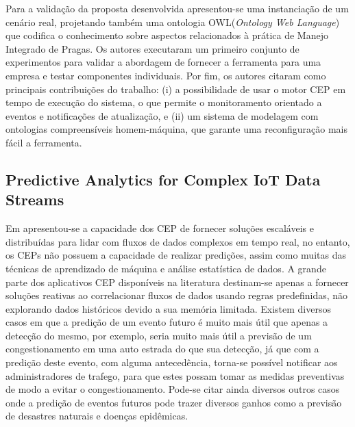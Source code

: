 \documentclass[ti,table]{texufpel} %
\begin{document}
     

    Para a validação da proposta desenvolvida apresentou-se uma instanciação de um cenário real, projetando também uma ontologia OWL(\textit{Ontology Web Language}) que codifica o conhecimento sobre aspectos relacionados à prática de Manejo Integrado de Pragas. Os autores executaram um primeiro conjunto de experimentos para validar a abordagem de fornecer a ferramenta para uma empresa e testar componentes individuais. Por fim, os autores citaram como principais contribuições do trabalho: (i) a possibilidade de usar o motor CEP em tempo de execução do sistema, o que permite o monitoramento orientado a eventos e notificações de atualização, e (ii) um sistema de modelagem com ontologias compreensíveis homem-máquina, que garante uma reconfiguração mais fácil a ferramenta.  

     

  

  

\subsection{Predictive Analytics for Complex IoT Data Streams} 

  

  

    Em \cite{art4akbar2017predictive} apresentou-se a capacidade dos CEP de fornecer soluções escaláveis e distribuídas para lidar com fluxos de dados complexos em tempo real, no entanto, os CEPs  não possuem a capacidade de realizar predições, assim como muitas das técnicas de aprendizado de máquina e análise estatística de dados. A grande parte dos aplicativos CEP disponíveis na literatura destinam-se apenas a fornecer soluções reativas ao correlacionar fluxos de dados usando regras predefinidas, não explorando dados históricos devido a sua memória limitada. Existem diversos casos em que a predição de um evento futuro é muito mais útil que apenas a detecção do mesmo, por exemplo, seria muito mais útil a previsão de um congestionamento em uma auto estrada do que sua detecção, já que com a predição deste evento, com alguma antecedência, torna-se possível notificar aos administradores de trafego, para que estes possam tomar as medidas preventivas de modo a evitar o congestionamento. Pode-se citar ainda diversos outros casos onde a predição de eventos futuros pode trazer diversos ganhos como a previsão de desastres naturais e doenças epidêmicas.  

     
\end{document}
